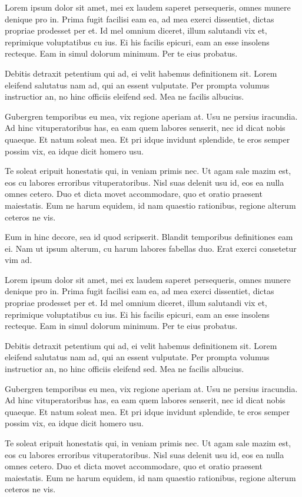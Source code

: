 Lorem ipsum dolor sit amet, mei ex laudem saperet persequeris, omnes munere denique pro in. Prima fugit facilisi eam ea, ad mea exerci dissentiet, dictas propriae prodesset per et. Id mel omnium diceret, illum salutandi vix et, reprimique voluptatibus cu ius. Ei his facilis epicuri, eam an esse insolens recteque. Eam in simul dolorum minimum. Per te eius probatus.

Debitis detraxit petentium qui ad, ei velit habemus definitionem sit. Lorem eleifend salutatus nam ad, qui an essent vulputate. Per prompta volumus instructior an, no hinc officiis eleifend sed. Mea ne facilis albucius.

Gubergren temporibus eu mea, vix regione aperiam at. Usu ne persius iracundia. Ad hinc vituperatoribus has, ea eam quem labores senserit, nec id dicat nobis quaeque. Et natum soleat mea. Et pri idque invidunt splendide, te eros semper possim vix, ea idque dicit homero usu.

Te soleat eripuit honestatis qui, in veniam primis nec. Ut agam sale mazim est, eos cu labores erroribus vituperatoribus. Nisl suas delenit usu id, eos ea nulla omnes cetero. Duo et dicta movet accommodare, quo et oratio praesent maiestatis. Eum ne harum equidem, id nam quaestio rationibus, regione alterum ceteros ne vis.

Eum in hinc decore, sea id quod scripserit. Blandit temporibus definitiones eam ei. Nam ut ipsum alterum, cu harum labores fabellas duo. Erat exerci consetetur vim ad.

Lorem ipsum dolor sit amet, mei ex laudem saperet persequeris, omnes munere denique pro in. Prima fugit facilisi eam ea, ad mea exerci dissentiet, dictas propriae prodesset per et. Id mel omnium diceret, illum salutandi vix et, reprimique voluptatibus cu ius. Ei his facilis epicuri, eam an esse insolens recteque. Eam in simul dolorum minimum. Per te eius probatus.

Debitis detraxit petentium qui ad, ei velit habemus definitionem sit. Lorem eleifend salutatus nam ad, qui an essent vulputate. Per prompta volumus instructior an, no hinc officiis eleifend sed. Mea ne facilis albucius.

Gubergren temporibus eu mea, vix regione aperiam at. Usu ne persius iracundia. Ad hinc vituperatoribus has, ea eam quem labores senserit, nec id dicat nobis quaeque. Et natum soleat mea. Et pri idque invidunt splendide, te eros semper possim vix, ea idque dicit homero usu.

Te soleat eripuit honestatis qui, in veniam primis nec. Ut agam sale mazim est, eos cu labores erroribus vituperatoribus. Nisl suas delenit usu id, eos ea nulla omnes cetero. Duo et dicta movet accommodare, quo et oratio praesent maiestatis. Eum ne harum equidem, id nam quaestio rationibus, regione alterum ceteros ne vis.

